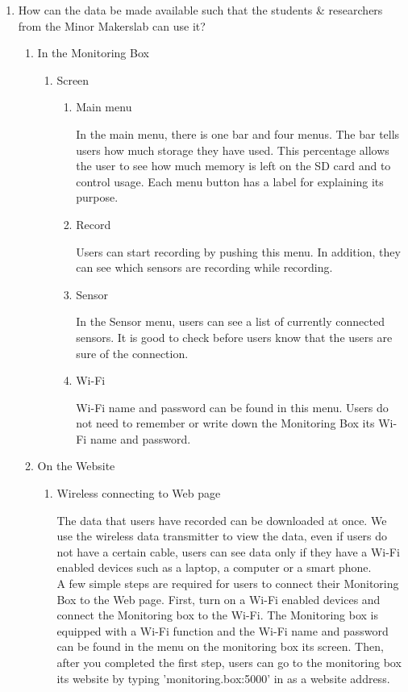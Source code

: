 \documentclass[conference]{IEEEtran}
\begin{document}
\begin{enumerate}
\item How can the data be made available such that the students \& researchers from the Minor Makerslab can use it?
\begin{enumerate}
\item In the Monitoring Box
\begin{enumerate}
\item Screen
\begin{enumerate}
\item Main menu

 In the main menu, there is one bar and four menus. The bar tells users how much storage they have used. This percentage allows the user to see how much memory is left on the SD card and to control usage. Each menu button has a label for explaining its purpose.\\
\item Record

 Users can start recording by pushing this menu. In addition, they can see which sensors are recording while recording.\\
\item Sensor

 In the Sensor menu, users can see a list of currently connected sensors. It is good to check before users know that the users are sure of the connection.\\
\item Wi-Fi

 Wi-Fi name and password can be found in this menu. Users do not need to remember or write down the Monitoring Box its Wi-Fi name and password.\\
\end{enumerate}

\end{enumerate}

\item On the Website
\begin{enumerate}
\item Wireless connecting to Web page

 The data that users have recorded can be downloaded at once. We use the wireless data transmitter to view the data, even if users do not have a certain cable, users can see data only if they have a Wi-Fi enabled devices such as a laptop, a computer or a smart phone. \\
 A few simple steps are required for users to connect their Monitoring Box to the Web page. First, turn on a Wi-Fi enabled devices and connect the Monitoring box to the Wi-Fi. The Monitoring box is equipped with a Wi-Fi function and the Wi-Fi name and password can be found in the menu on the monitoring box its screen. Then, after you completed the first step, users can go to the monitoring box its website by typing 'monitoring.box:5000' in as a website address.\\


\end{enumerate}
\end{enumerate}
\end{enumerate}
\end{document}
